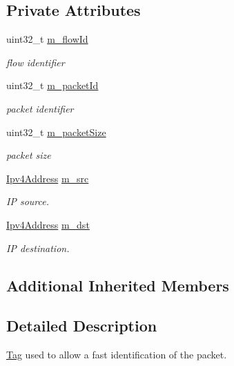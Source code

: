 \subsection*{Private Attributes}
\begin{DoxyCompactItemize}
\item 
uint32\+\_\+t \hyperlink{classns3_1_1Ipv4FlowProbeTag_ad577bd999a96c16f46c0e0d142277b9b}{m\+\_\+flow\+Id}
\begin{DoxyCompactList}\small\item\em flow identifier \end{DoxyCompactList}\item 
uint32\+\_\+t \hyperlink{classns3_1_1Ipv4FlowProbeTag_abba1edc37d1fdb662905387cb921f58b}{m\+\_\+packet\+Id}
\begin{DoxyCompactList}\small\item\em packet identifier \end{DoxyCompactList}\item 
uint32\+\_\+t \hyperlink{classns3_1_1Ipv4FlowProbeTag_a1d90f5197346dd77efe8a53143249ba6}{m\+\_\+packet\+Size}
\begin{DoxyCompactList}\small\item\em packet size \end{DoxyCompactList}\item 
\hyperlink{classns3_1_1Ipv4Address}{Ipv4\+Address} \hyperlink{classns3_1_1Ipv4FlowProbeTag_afed6c12ddaf57c3c547473a54308cf5a}{m\+\_\+src}
\begin{DoxyCompactList}\small\item\em IP source. \end{DoxyCompactList}\item 
\hyperlink{classns3_1_1Ipv4Address}{Ipv4\+Address} \hyperlink{classns3_1_1Ipv4FlowProbeTag_a84e4eb6979933a71e35885bb91bef3ce}{m\+\_\+dst}
\begin{DoxyCompactList}\small\item\em IP destination. \end{DoxyCompactList}\end{DoxyCompactItemize}
\subsection*{Additional Inherited Members}


\subsection{Detailed Description}
\hyperlink{classns3_1_1Tag}{Tag} used to allow a fast identification of the packet. 

